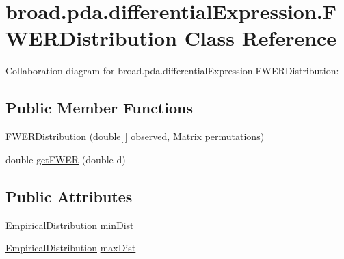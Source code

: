 \hypertarget{classbroad_1_1pda_1_1differential_expression_1_1_f_w_e_r_distribution}{\section{broad.\+pda.\+differential\+Expression.\+F\+W\+E\+R\+Distribution Class Reference}
\label{classbroad_1_1pda_1_1differential_expression_1_1_f_w_e_r_distribution}
}


Collaboration diagram for broad.\+pda.\+differential\+Expression.\+F\+W\+E\+R\+Distribution\+:
\subsection*{Public Member Functions}
\begin{DoxyCompactItemize}
\item 
\hyperlink{classbroad_1_1pda_1_1differential_expression_1_1_f_w_e_r_distribution_a5e22919381dd580ee42f90dfe0502d0e}{F\+W\+E\+R\+Distribution} (double\mbox{[}$\,$\mbox{]} observed, \hyperlink{class_jama_1_1_matrix}{Matrix} permutations)
\item 
double \hyperlink{classbroad_1_1pda_1_1differential_expression_1_1_f_w_e_r_distribution_a203c1c623f968e01d73d1bae77ceb799}{get\+F\+W\+E\+R} (double d)
\end{DoxyCompactItemize}
\subsection*{Public Attributes}
\begin{DoxyCompactItemize}
\item 
\hyperlink{classbroad_1_1core_1_1math_1_1_empirical_distribution}{Empirical\+Distribution} \hyperlink{classbroad_1_1pda_1_1differential_expression_1_1_f_w_e_r_distribution_a6359849d46c899f9e12afb7bcb343816}{min\+Dist}
\item 
\hyperlink{classbroad_1_1core_1_1math_1_1_empirical_distribution}{Empirical\+Distribution} \hyperlink{classbroad_1_1pda_1_1differential_expression_1_1_f_w_e_r_distribution_aaf7276a0d911c55ce4142af6316501bc}{max\+Dist}
\end{DoxyCompactItemize}


